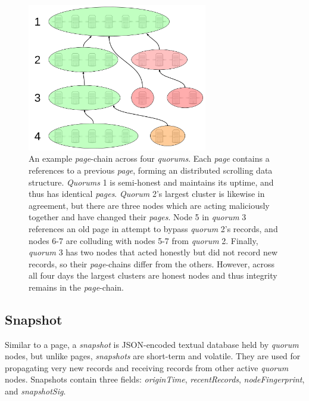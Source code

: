 \begin{figure}[htbp]
	\centering
	\includegraphics[width=0.7\textwidth]{images/LucidCharts/Page-chain.png}
	\caption{An example \emph{page}-chain across four \emph{quorums}. Each \emph{page} contains a references to a previous \emph{page}, forming an distributed scrolling data structure. \emph{Quorums} 1 is semi-honest and maintains its uptime, and thus has identical \emph{pages}. \emph{Quorum} 2's largest cluster is likewise in agreement, but there are three nodes which are acting maliciously together and have changed their \emph{pages}. Node 5 in \emph{quorum} 3 references an old page in attempt to bypass \emph{quorum} 2's records, and nodes 6-7 are colluding with nodes 5-7 from \emph{quorum} 2. Finally, \emph{quorum} 3 has two nodes that acted honestly but did not record new records, so their \emph{page}-chains differ from the others. However, across all four days the largest clusters are honest nodes and thus integrity remains in the \emph{page}-chain.}
\end{figure}




\subsection{Snapshot}

Similar to a page, a \emph{snapshot} is JSON-encoded textual database held by \emph{quorum} nodes, but unlike pages, \emph{snapshots} are short-term and volatile. They are used for propagating very new records and receiving records from other active \emph{quorum} nodes. Snapshots contain three fields: \emph{originTime}, \emph{recentRecords}, \emph{nodeFingerprint}, and \emph{snapshotSig}.

